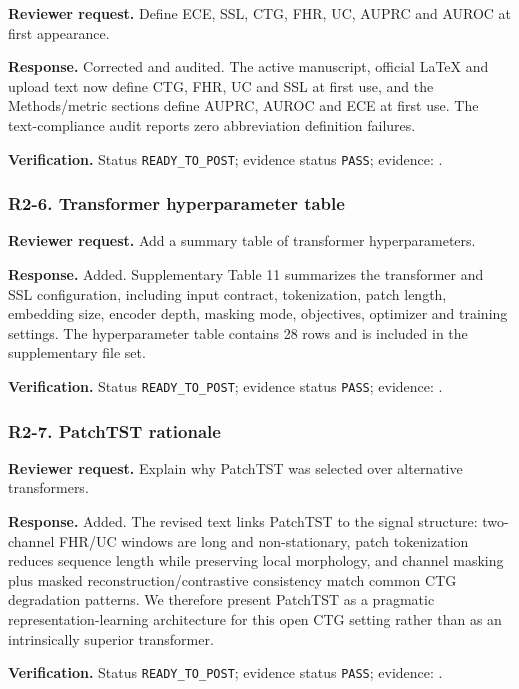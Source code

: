 \documentclass[11pt]{article}
\begin{document}
\textbf{Reviewer request.} Define ECE, SSL, CTG, FHR, UC, AUPRC and AUROC at first appearance.


\textbf{Response.} Corrected and audited. The active manuscript, official LaTeX and upload text now define CTG, FHR, UC and SSL at first use, and the Methods/metric sections define AUPRC, AUROC and ECE at first use. The text-compliance audit reports zero abbreviation definition failures.


\textbf{Verification.} Status \texttt{READY\_TO\_POST}; evidence status \texttt{PASS}; evidence: .


\subsubsection*{R2-6. Transformer hyperparameter table}

\textbf{Reviewer request.} Add a summary table of transformer hyperparameters.


\textbf{Response.} Added. Supplementary Table 11 summarizes the transformer and SSL configuration, including input contract, tokenization, patch length, embedding size, encoder depth, masking mode, objectives, optimizer and training settings. The hyperparameter table contains 28 rows and is included in the supplementary file set.


\textbf{Verification.} Status \texttt{READY\_TO\_POST}; evidence status \texttt{PASS}; evidence: .


\subsubsection*{R2-7. PatchTST rationale}

\textbf{Reviewer request.} Explain why PatchTST was selected over alternative transformers.


\textbf{Response.} Added. The revised text links PatchTST to the signal structure: two-channel FHR/UC windows are long and non-stationary, patch tokenization reduces sequence length while preserving local morphology, and channel masking plus masked reconstruction/contrastive consistency match common CTG degradation patterns. We therefore present PatchTST as a pragmatic representation-learning architecture for this open CTG setting rather than as an intrinsically superior transformer.


\textbf{Verification.} Status \texttt{READY\_TO\_POST}; evidence status \texttt{PASS}; evidence: .
\end{document}
